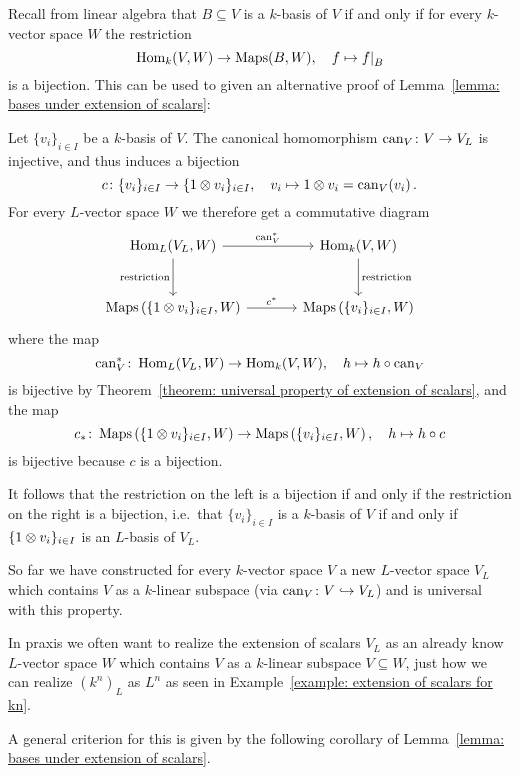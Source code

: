 \begin{remark}
  Recall from linear algebra that $B \subseteq V$ is a $k$-basis of $V$ if and only if for every $k$-vector space $W$ the restriction
  \[
            \Hom_k(V,W)
    \to     \Maps(B,W),
    \quad   f
    \mapsto \restrict{f}{B}
  \]
  is a bijection.
  This can be used to given an alternative proof of Lemma~\ref{lemma: bases under extension of scalars}:
  
  Let $\{v_i\}_{i \in I}$ be a $k$-basis of $V$.
  The canonical homomorphism $\operatorname{can}_V \colon V \to V_L$ is injective, and thus induces a bijection
  \[
            c
    \colon  \{v_i\}_{i \in I}
    \to     \{1 \mathbin{\otimes} v_i\}_{i \in I},
    \quad   v_i
    \mapsto 1 \mathbin{\otimes} v_i
    =       \operatorname{can}_V(v_i) \,.
  \]
  For every $L$-vector space $W$ we therefore get a commutative diagram
  \[
    \begin{tikzcd}[sep = large]
        \Hom_L(V_L, W)
        \arrow{r}[above]{\can_V^*}
        \arrow{d}[left]{\text{restriction}}
      & \Hom_k(V,W)
        \arrow{d}[right]{\text{restriction}}
      \\
        \Maps\left( \{1 \tensor v_i\}_{i \in I}, W \right)
        \arrow{r}[above]{c^*}
      & \Maps\left( \{v_i\}_{i \in I}, W \right)
    \end{tikzcd}
  \]
  where the map
  \[
            \operatorname{can}_V^*
    \colon  \operatorname{Hom}_L(V_L, W)
    \to     \operatorname{Hom}_k(V, W),
    \quad   h
    \mapsto h \circ \operatorname{can}_V
  \]
  is bijective by Theorem~\ref{theorem: universal property of extension of scalars}, and the map
  \[
            c_*
    \colon  \operatorname{Maps}\left( \{1 \mathbin{\otimes} v_i\}_{i \in I}, W \right)
    \to     \operatorname{Maps}\left( \{v_i\}_{i \in I}, W \right),
    \quad   h
    \mapsto h \circ c
  \]
  is bijective because $c$ is a bijection.
  
  It follows that the restriction on the left is a bijection if and only if the restriction on the right is a bijection, i.e.\ that $\{v_i\}_{i \in I}$ is a $k$-basis of $V$ if and only if $\{1 \mathbin{\otimes} v_i\}_{i \in I}$ is an $L$-basis of $V_L$.
\end{remark}


\begin{fluff}
  So far we have constructed for every $k$-vector space $V$ a new $L$-vector space $V_L$ which contains $V$ as a $k$-linear subspace (via $\operatorname{can}_V \colon V \hookrightarrow V_L$) and is universal with this property.
  
  In praxis we often want to realize the extension of scalars $V_L$ as an already know $L$-vector space $W$ which contains $V$ as a $k$-linear subspace $V \subseteq W$, just how we can realize $(k^n)_L$ as $L^n$ as seen in Example~\ref{example: extension of scalars for kn}.
  
  A general criterion for this is given by the following corollary of Lemma~\ref{lemma: bases under extension of scalars}.
\end{fluff}


